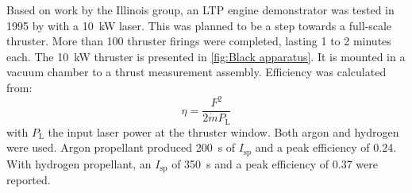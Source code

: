         Based on work by the Illinois group, an LTP engine demonstrator was tested in 1995 by \textcite{blackLaserPropulsion10kW1995} with a \qty{10}{kW}  laser. This was planned to be a step towards a full-scale thruster. More than 100 thruster firings were completed, lasting 1 to 2 minutes each. The \qty{10}{kW} thruster is presented in \autoref{fig:Black apparatus}. It is mounted in a vacuum chamber to a thrust measurement assembly. Efficiency was calculated from:
        \[ \eta = \frac{F^2}{2 \dot{m} P_\mathrm{L}} \]
        with $P_\mathrm{L}$ the input laser power at the thruster window. Both argon and hydrogen were used. Argon propellant produced \qty{200}{s} of $I_\mathrm{sp}$ and a peak efficiency of 0.24. With hydrogen propellant, an $I_\mathrm{sp}$ of \qty{350}{s} and a peak efficiency of 0.37 were reported.
        \begin{figure}[!ht]
            \centering
            \begin{subfigure}[t]{0.3\textwidth}
                \centering

\end{subfigure}
\end{figure}
